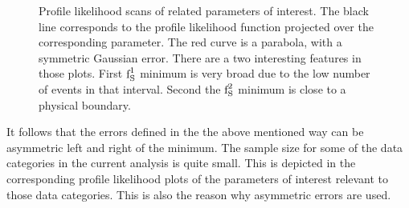 \begin{figure}[!t]
  \centering
  \begin{subfigure}{0.5\textwidth}
    \raggedright
    \scalebox{0.57}{}
    \caption{}
    \label{nll_ASMag2_bin1}
  \end{subfigure}%
  \hfill%
  \begin{subfigure}{0.5\textwidth}
    \raggedleft
    \scalebox{0.57}{}
    \caption{}
    \label{nll_ASPhase_bin1}
  \end{subfigure}
  \begin{subfigure}{0.5\textwidth}
    \raggedright
    \scalebox{0.57}{}
    \caption{}
    \label{nll_ASMag2_bin1}
  \end{subfigure}%
  \hfill%
  \begin{subfigure}{0.5\textwidth}
    \raggedleft
    \scalebox{0.57}{}
    \caption{}
    \label{nll_ASPhase_bin3}
  \end{subfigure}
  \caption{Profile likelihood scans of \swave related parameters of interest. The black line corresponds to the profile likelihood
         function projected over the corresponding parameter. The red curve is a parabola, with a symmetric Gaussian
         error. There are a two interesting features in those plots. First $\text{f}_{\text{S}}^{1}$ minimum is very broad due to the
         low number of events in that \mkpi interval. Second the $\text{f}_{\text{S}}^{2}$ minimum is close to a physical boundary.}
\end{figure}

It follows that the errors defined in the the above mentioned way can be asymmetric left and right of the minimum.
The sample size for some of the data categories in the current analysis is quite small. This is depicted in the corresponding profile
likelihood plots of the parameters of interest relevant to those data categories. This is also the reason why asymmetric errors are used.

